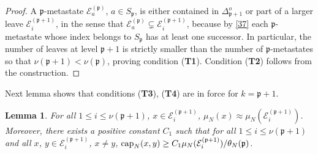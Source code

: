 \documentclass[reqno]{amsart}
\newtheorem{lemma}[theorem]{Lemma}
\begin{document}
\begin{proof}
A ${{\mathfrak p}}$-metastate ${{\mathcal E}}^{({{\mathfrak p}})}_a$, $a\in S_{{{\mathfrak p}}}$, is either
contained in $\Delta^o_{{{\mathfrak p}}+1}$ or part of a larger leave ${{\mathcal E}}^{({{\mathfrak p}} +1)}_i$, in the sense that ${{\mathcal E}}^{({{\mathfrak p}})}_a \subsetneq {{\mathcal E}}^{({{\mathfrak p}} +1)}_i$, because by \eqref{37} each ${{\mathfrak p}}$-metastate whose
index belongs to $S_{{{\mathfrak p}}}$ has at least one successor. In
particular, the number of leaves at level ${{\mathfrak p}}+1$ is strictly
smaller than the number of ${{\mathfrak p}}$-metastates so that $\nu({{\mathfrak p}}+1) <
\nu({{\mathfrak p}})$, proving condition ({\bf T1}). Condition ({\bf T2})
follows from the construction.
\end{proof}

Next lemma shows that conditions ({\bf T3}), ({\bf T4}) are in force
for $k={{\mathfrak p}}+1$.

\begin{lemma}
\label{s09}
For all $1\le i\le \nu({{\mathfrak p}}+1)$, $x\in {{\mathcal E}}^{({{\mathfrak p}} +1)}_i$,
$\mu_N(x) \approx \mu_N({{\mathcal E}}^{({{\mathfrak p}} +1)}_i)$. Moreover, there exists
a positive constant $C_1$ such that for all $1\le i\le \nu({{\mathfrak p}}+1)$
and all $x$, $y \in {{\mathcal E}}^{({{\mathfrak p}} +1)}_i$, $x\not = y$, ${{\rm cap}}_N (x,y)
\ge C_1 \mu_N({{\mathcal E}}^{({{\mathfrak p}} +1)}_i)/\theta_N({{\mathfrak p}})$.
\end{lemma}
\end{document}
